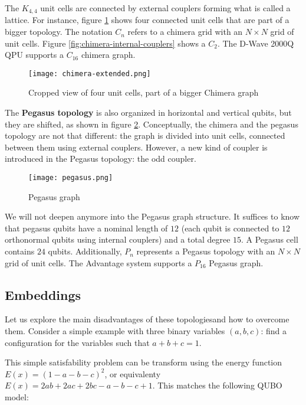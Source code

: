 The $K_{4,4}$ unit cells are connected by external couplers forming what is called a lattice. For instance, figure \ref{fig:chimera-extended} shows four connected unit cells that are part of a bigger topology. The notation $C_n$ refers to a chimera grid with an $N \times N$ grid of unit cells. Figure \ref{fig:chimera-internal-couplers} shows a $C_2$. The D-Wave 2000Q QPU supports a $C_{16}$ chimera graph.

\begin{figure}[h]
	\texttt{[image: chimera-extended.png]}
	\centering
	\caption{Cropped view of four unit cells, part of a bigger Chimera graph \cite{DWaveDoc-Architecture}}
	\label{fig:chimera-extended}
\end{figure}

The \textbf{Pegasus topology} is also organized in horizontal and vertical qubits, but they are shifted, as shown in figure \ref{fig:pegasus}. Conceptually, the chimera and the pegasus topology are not that different: the graph is divided into unit cells, connected between them using external couplers. However, a new kind of coupler is introduced in the Pegasus topology: the odd coupler.

\begin{figure}[h]
	\texttt{[image: pegasus.png]}
	\centering
	\caption{Pegasus graph \cite{DWaveDoc-Architecture}}
	\label{fig:pegasus}
\end{figure}

We will not deepen anymore into the Pegasus graph structure. It suffices to know that pegasus qubits have a nominal length of $12$ (each qubit is connected to $12$ orthonormal qubits using internal couplers) and a total degree $15$. A Pegasus cell contains $24$ qubits. Additionally, $P_n$ represents a Pegasus topology with an $N \times N$ grid of unit cells. The Advantage system supports a $P_{16}$ Pegasus graph.


\subsection{Embeddings}
\label{sec:embeddings}

Let us explore the main disadvantages of these topologiesand how to overcome them. Consider a simple example with three binary variables $(a, b, c)$: find a configuration for the variables such that $a + b + c = 1$.

This simple satisfability problem can be transform using the energy function $E(x) = (1 - a - b - c)^2$, or equivalenty $E(x) = 2ab + 2ac + 2bc - a - b - c + 1$. This matches the following QUBO model:

